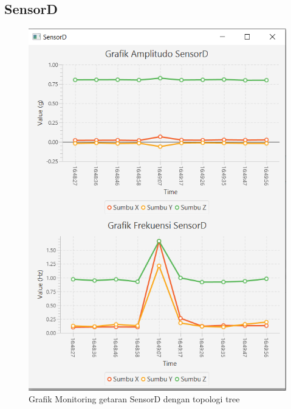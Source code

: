 \subsection{SensorD}
\begin{figure}[H] 
	\centering  
	\includegraphics[scale=1]{Lampiran/HasilPengujian/sensorD_tree.PNG} 
	\caption[Grafik Monitoring getaran SensorD dengan topologi tree]{Grafik Monitoring getaran SensorD dengan topologi tree}
	\label{fig:grafik_D_tree_paskal} 
\end{figure}

